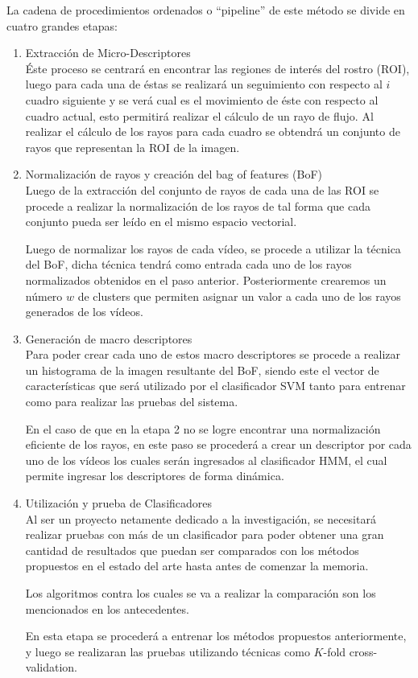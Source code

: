 \documentclass{article}
\begin{document}
La cadena de procedimientos ordenados o “pipeline” de este método se divide en cuatro grandes etapas:
    \begin{enumerate}
    \item Extracción de Micro-Descriptores\\
    Éste proceso se centrará en encontrar las regiones de interés del rostro (ROI), luego para cada una de éstas se realizará un seguimiento con respecto al $i$ cuadro siguiente y se verá cual es el movimiento de éste con respecto al cuadro actual, esto permitirá realizar el cálculo de un rayo de flujo. Al realizar el cálculo de los rayos para cada cuadro se obtendrá un conjunto de rayos que representan la ROI de la imagen.
    \item Normalización de rayos y creación del bag of features (BoF)\\
Luego de la extracción del conjunto de rayos de cada una de las ROI se procede a realizar la normalización de los rayos de tal forma que cada conjunto pueda ser leído en el mismo espacio vectorial.

Luego de normalizar los rayos de cada vídeo, se procede a utilizar la técnica del BoF, dicha técnica tendrá como entrada cada uno de los rayos normalizados obtenidos en el paso anterior. Posteriormente crearemos un número $w$ de clusters que permiten asignar un valor a cada uno de los rayos generados de los vídeos. 

    \item Generación de macro descriptores\\
Para poder crear cada uno de estos macro descriptores se procede a realizar un histograma de la imagen resultante del BoF, siendo este el vector de características que será utilizado por el clasificador SVM tanto para entrenar como para realizar las pruebas del sistema.

En el caso de que en la etapa 2 no se logre encontrar una normalización eficiente de los rayos, en este paso se procederá a crear un descriptor por cada uno de los vídeos los cuales serán ingresados al clasificador HMM, el cual permite ingresar los descriptores de forma dinámica.
	
    \item Utilización y prueba de Clasificadores\\
Al ser un proyecto netamente dedicado a la investigación, se necesitará realizar pruebas con más de un clasificador para poder obtener una gran cantidad de resultados que puedan ser comparados con los métodos propuestos en el estado del arte hasta antes de comenzar la memoria. 

Los algoritmos contra los cuales se va a realizar la comparación son los mencionados en los antecedentes.

En esta etapa se procederá a entrenar los métodos propuestos anteriormente, y luego se realizaran las pruebas utilizando técnicas como $K$-fold cross-validation.
    \end{enumerate}
    
\end{document}
